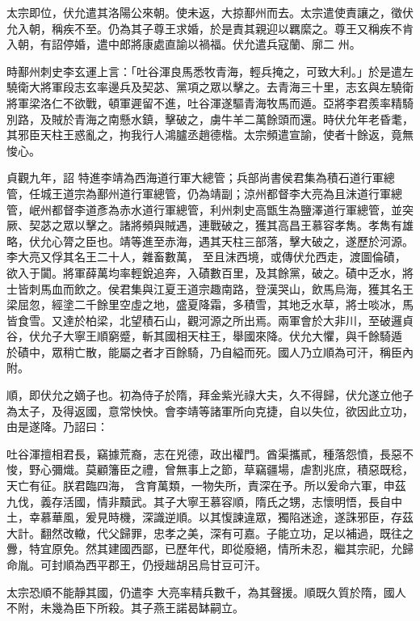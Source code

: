 \begin{pinyinscope}
 太宗即位，伏允遣其洛陽公來朝。使未返，大掠鄯州而去。太宗遣使責讓之，徵伏允入朝，稱疾不至。仍為其子尊王求婚，於是責其親迎以羈縻之。尊王又稱疾不肯入朝，有詔停婚，遣中郎將康處直諭以禍福。伏允遣兵寇蘭、廓二
 州。



 時鄯州刺史李玄運上言：「吐谷渾良馬悉牧青海，輕兵掩之，可致大利。」於是遣左驍衛大將軍段志玄率邊兵及契苾、黨項之眾以擊之。去青海三十里，志玄與左驍衛將軍梁洛仁不欲戰，頓軍遲留不進，吐谷渾遂驅青海牧馬而遁。亞將李君羨率精騎別路，及賊於青海之南懸水鎮，擊破之，虜牛羊二萬餘頭而還。時伏允年老昏耄，其邪臣天柱王惑亂之，拘我行人鴻臚丞趙德楷。太宗頻遣宣諭，使者十餘返，竟無悛心。



 貞觀九年，詔
 特進李靖為西海道行軍大總管；兵部尚書侯君集為積石道行軍總管，任城王道宗為鄯州道行軍總管，仍為靖副；涼州都督李大亮為且沫道行軍總管，岷州都督李道彥為赤水道行軍總管，利州刺史高甑生為鹽澤道行軍總管，並突厥、契苾之眾以擊之。諸將頻與賊遇，連戰破之，獲其高昌王慕容孝雋。孝雋有雄略，伏允心膂之臣也。靖等進至赤海，遇其天柱三部落，擊大破之，遂歷於河源。李大亮又俘其名王二十人，雜畜數萬，
 至且沫西境，或傳伏允西走，渡圖倫磧，欲入于闐。將軍薛萬均率輕銳追奔，入磧數百里，及其餘黨，破之。磧中乏水，將士皆刺馬血而飲之。侯君集與江夏王道宗趣南路，登漢哭山，飲馬烏海，獲其名王梁屈忽，經塗二千餘里空虛之地，盛夏降霜，多積雪，其地乏水草，將士啖冰，馬皆食雪。又達於柏梁，北望積石山，觀河源之所出焉。兩軍會於大非川，至破邏貞谷，伏允子大寧王順窮蹙，斬其國相天柱王，舉國來降。伏允大懼，與千餘騎遁
 於磧中，眾稍亡散，能屬之者才百餘騎，乃自縊而死。國人乃立順為可汗，稱臣內附。



 順，即伏允之嫡子也。初為侍子於隋，拜金紫光祿大夫，久不得歸，伏允遂立他子為太子，及得返國，意常怏怏。會李靖等諸軍所向克捷，自以失位，欲因此立功，由是遂降。乃詔曰：



 吐谷渾擅相君長，竊據荒裔，志在兇德，政出權門。酋渠攜貳，種落怨憤，長惡不悛，野心彌熾。莫顧籓臣之禮，曾無事上之節，草竊疆場，虐割兆庶，積惡既稔，天亡有征。朕君臨四海，
 含育萬類，一物失所，責深在予。所以爰命六軍，申茲九伐，義存活國，情非黷武。其子大寧王慕容順，隋氏之甥，志懷明悟，長自中土，幸慕華風，爰見時機，深識逆順。以其愎諫違眾，獨陷迷途，遂誅邪臣，存茲大計。翻然改轍，代父歸罪，忠孝之美，深有可嘉。子能立功，足以補過，既往之釁，特宜原免。然其建國西鄙，已歷年代，即從廢絕，情所未忍，繼其宗祀，允歸命胤。可封順為西平郡王，仍授趉胡呂烏甘豆可汗。



 太宗恐順不能靜其國，仍遣李
 大亮率精兵數千，為其聲援。順既久質於隋，國人不附，未幾為臣下所殺。其子燕王諾曷缽嗣立。




\end{pinyinscope}

